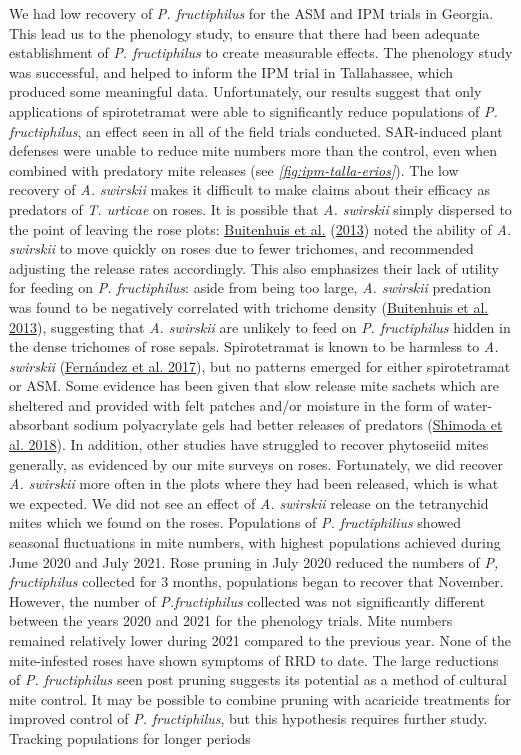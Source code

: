 \documentclass[12pt,final,CPage]{ufthesis}
\begin{document}
{  We had low recovery of \emph{P. fructiphilus} for the ASM and IPM trials in Georgia. This lead us to the phenology study, to ensure that there had been adequate establishment of \emph{P. fructiphilus} to create measurable effects. The phenology study was successful, and helped to inform the IPM trial in Tallahassee, which produced some meaningful data. Unfortunately, our results suggest that only applications of spirotetramat were able to significantly reduce populations of \emph{P. fructiphilus}, an effect seen in all of the field trials conducted. SAR-induced plant defenses were unable to reduce mite numbers more than the control, even when combined with predatory mite releases (see \emph{\ref{fig:ipm-talla-erios}}). The low recovery of \emph{A. swirskii} makes it difficult to make claims about their efficacy as predators of \emph{T. urticae} on roses. It is possible that \emph{A. swirskii} simply dispersed to the point of leaving the rose plots: \protect\hyperlink{ref-Buitenhuis2013}{Buitenhuis et al.} (\protect\hyperlink{ref-Buitenhuis2013}{2013}) noted the ability of \emph{A. swirskii} to move quickly on roses due to fewer trichomes, and recommended adjusting the release rates accordingly. This also emphasizes their lack of utility for feeding on \emph{P. fructiphilus}: aside from being too large, \emph{A. swirskii} predation was found to be negatively correlated with trichome density (\protect\hyperlink{ref-Buitenhuis2013}{Buitenhuis et al. 2013}), suggesting that \emph{A. swirskii} are unlikely to feed on \emph{P. fructiphilus} hidden in the dense trichomes of rose sepals. Spirotetramat is known to be harmless to \emph{A. swirskii} (\protect\hyperlink{ref-Fernandez2017}{Fernández et al. 2017}), but no patterns emerged for either spirotetramat or ASM. Some evidence has been given that slow release mite sachets which are sheltered and provided with felt patches and/or moisture in the form of water-absorbant sodium polyacrylate gels had better releases of predators (\protect\hyperlink{ref-Shimoda2018}{Shimoda et al. 2018}). In addition, other studies have struggled to recover phytoseiid mites generally, as evidenced by our mite surveys on roses. Fortunately, we did recover \emph{A. swirskii} more often in the plots where they had been released, which is what we expected. We did not see an effect of \emph{A. swirskii} release on the tetranychid mites which we found on the roses. Populations of \emph{P. fructiphilius} showed seasonal fluctuations in mite numbers, with highest populations achieved during June 2020 and July 2021. Rose pruning in July 2020 reduced the numbers of \emph{P, fructiphilus} collected for 3 months, populations began to recover that November. However, the number of \emph{P.fructiphilus} collected was not significantly different between the years 2020 and 2021 for the phenology trials. Mite numbers remained relatively lower during 2021 compared to the previous year. None of the mite-infested roses have shown symptoms of RRD to date. The large reductions of \emph{P. fructiphilus} seen post pruning suggests its potential as a method of cultural mite control. It may be possible to combine pruning with acaricide treatments for improved control of \emph{P. fructiphilus}, but this hypothesis requires further study. Tracking populations for longer periods }
\end{document}
